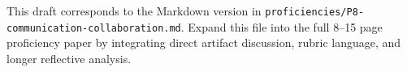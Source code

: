 \documentclass[12pt]{article}
\begin{document}
\begin{titlepage}\begin{center}\vspace*{0.2\textheight}{\Large\bfseries Proficiency 8: Communication and Collaboration\par}\vspace{2em}{\PortfolioAuthor\par}{\PortfolioAffiliation\par}{\PortfolioProgram\par}\vspace{2em}{\PortfolioDate\par}\end{center}\end{titlepage}
This draft corresponds to the Markdown version in \texttt{proficiencies/P8-communication-collaboration.md}. Expand this file into the full 8--15 page proficiency paper by integrating direct artifact discussion, rubric language, and longer reflective analysis.
\end{document}
